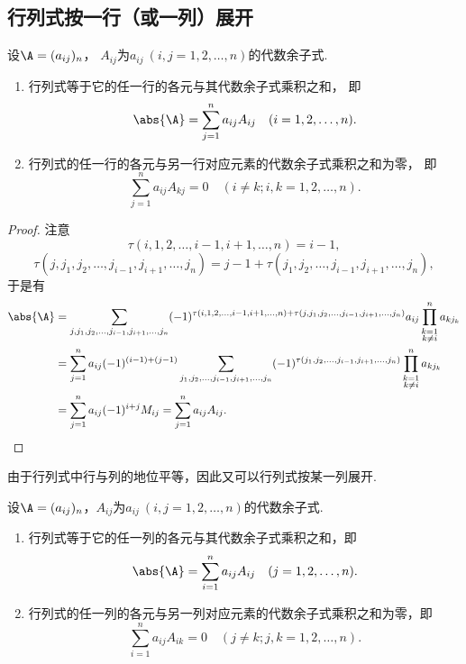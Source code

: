 \subsection{行列式按一行（或一列）展开}
\begin{theorem}
设\(\A=(a_{ij})_n\)，
\(A_{ij}\)为\(a_{ij}\ (i,j=1,2,\dotsc,n)\)的代数余子式.
\begin{enumerate}
	\item 行列式等于它的任一行的各元与其代数余子式乘积之和，
	即\begin{equation}
		\abs{\A} = \sum_{j=1}^n a_{ij} A_{ij}
		\quad(i=1,2,\dotsc,n).
	\end{equation}

	\item 行列式的任一行的各元与另一行对应元素的代数余子式乘积之和为零，
	即\begin{equation}
		\sum_{j=1}^n a_{ij} A_{kj} = 0
		\quad(i \neq k;
		i,k=1,2,\dotsc,n).
	\end{equation}
\end{enumerate}
\begin{proof}
注意\[
	\tau(i,1,2,\dotsc,i-1,i+1,\dotsc,n) = i-1,
\]\[
	\tau(j,j_1,j_2,\dotsc,j_{i-1},j_{i+1},\dotsc,j_n)
	= j-1+\tau(j_1,j_2,\dotsc,j_{i-1},j_{i+1},\dotsc,j_n),
\]于是有\begin{align*}
	\abs{\A}
	&= \sum_{j,j_1,j_2,\dotsc,j_{i-1},j_{i+1},\dotsc,j_n}
		(-1)^{\tau(i,1,2,\dotsc,i-1,i+1,\dotsc,n) + \tau(j,j_1,j_2,\dotsc,j_{i-1},j_{i+1},\dotsc,j_n)}
		a_{ij} \prod_{\substack{k=1 \\ k \neq i}}^n a_{k j_k} \\
	&= \sum_{j=1}^n a_{ij} (-1)^{(i-1)+(j-1)}
		\sum_{j_1,j_2,\dotsc,j_{i-1},j_{i+1},\dotsc,j_n}
			(-1)^{\tau(j_1,j_2,\dotsc,j_{i-1},j_{i+1},\dotsc,j_n)}
				\prod_{\substack{k=1 \\ k \neq i}}^n a_{k j_k} \\
	&= \sum_{j=1}^n a_{ij} (-1)^{i+j} M_{ij}
	= \sum_{j=1}^n a_{ij} A_{ij}.
	\qedhere
\end{align*}
\end{proof}
\end{theorem}

由于行列式中行与列的地位平等，因此又可以行列式按某一列展开.
\begin{theorem}
设\(\A=(a_{ij})_n\)，\(A_{ij}\)为\(a_{ij}\ (i,j=1,2,\dotsc,n)\)的代数余子式.
\begin{enumerate}
	\item 行列式等于它的任一列的各元与其代数余子式乘积之和，即\begin{equation}
		\abs{\A} = \sum_{i=1}^n a_{ij} A_{ij}
		\quad(j=1,2,\dotsc,n).
	\end{equation}

	\item 行列式的任一列的各元与另一列对应元素的代数余子式乘积之和为零，即\begin{equation}
		\sum_{i=1}^n a_{ij} A_{ik} = 0
		\quad(j \neq k;
		j,k=1,2,\dotsc,n).
	\end{equation}
\end{enumerate}
\end{theorem}

